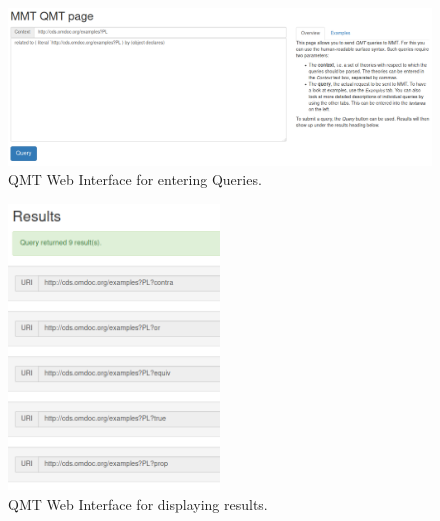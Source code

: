 \begin{figure}[h]
  \begin{center}
    \includegraphics[width=1.0\textwidth]{imgs/QMTquery.png}
  \end{center}
  \caption{QMT Web Interface for entering Queries. }
  \label{fig:webinterface:entering}
\end{figure}

\begin{figure}[h]
  \begin{center}
    \includegraphics[width=0.5\textwidth]{imgs/QMTresults.png}
  \end{center}
  \caption{QMT Web Interface for displaying results. }
  \label{fig:webinterface:results}
\end{figure}